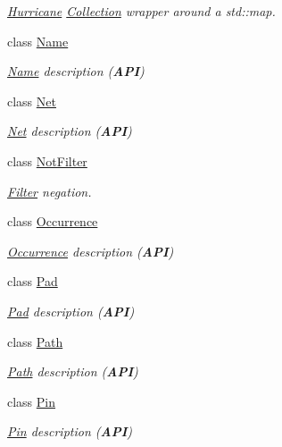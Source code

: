\begin{DoxyCompactItemize}
\begin{DoxyCompactList}\small\item\em \mbox{\hyperlink{namespaceHurricane}{Hurricane}} \mbox{\hyperlink{classHurricane_1_1Collection}{Collection}} wrapper around a std\+::map. \end{DoxyCompactList}\item 
class \mbox{\hyperlink{classHurricane_1_1Name}{Name}}
\begin{DoxyCompactList}\small\item\em \mbox{\hyperlink{classHurricane_1_1Name}{Name}} description ({\bfseries A\+PI}) \end{DoxyCompactList}\item 
class \mbox{\hyperlink{classHurricane_1_1Net}{Net}}
\begin{DoxyCompactList}\small\item\em \mbox{\hyperlink{classHurricane_1_1Net}{Net}} description ({\bfseries A\+PI}) \end{DoxyCompactList}\item 
class \mbox{\hyperlink{classHurricane_1_1NotFilter}{Not\+Filter}}
\begin{DoxyCompactList}\small\item\em \mbox{\hyperlink{classHurricane_1_1Filter}{Filter}} negation. \end{DoxyCompactList}\item 
class \mbox{\hyperlink{classHurricane_1_1Occurrence}{Occurrence}}
\begin{DoxyCompactList}\small\item\em \mbox{\hyperlink{classHurricane_1_1Occurrence}{Occurrence}} description ({\bfseries A\+PI}) \end{DoxyCompactList}\item 
class \mbox{\hyperlink{classHurricane_1_1Pad}{Pad}}
\begin{DoxyCompactList}\small\item\em \mbox{\hyperlink{classHurricane_1_1Pad}{Pad}} description ({\bfseries A\+PI}) \end{DoxyCompactList}\item 
class \mbox{\hyperlink{classHurricane_1_1Path}{Path}}
\begin{DoxyCompactList}\small\item\em \mbox{\hyperlink{classHurricane_1_1Path}{Path}} description ({\bfseries A\+PI}) \end{DoxyCompactList}\item 
class \mbox{\hyperlink{classHurricane_1_1Pin}{Pin}}
\begin{DoxyCompactList}\small\item\em \mbox{\hyperlink{classHurricane_1_1Pin}{Pin}} description ({\bfseries A\+PI}) \end{DoxyCompactList}\item 

\end{DoxyCompactItemize}
